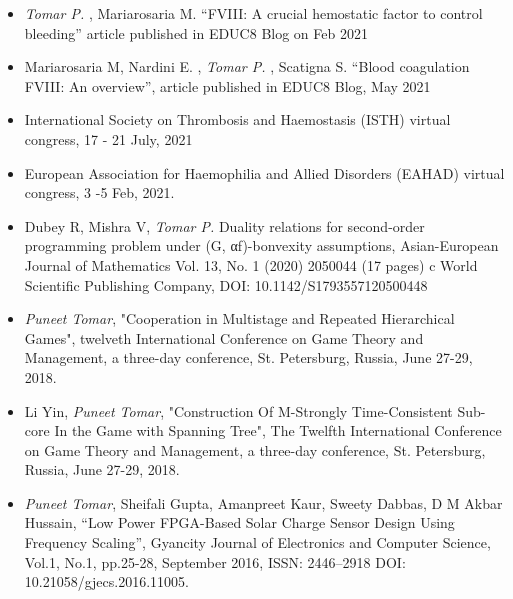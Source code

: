 




\begin{cvparagraph}

\begin{itemize}[label=$\S$]

\item {{\it Tomar P.} , Mariarosaria M.  “FVIII: A crucial hemostatic factor to control bleeding'' article published in EDUC8 Blog on Feb 2021}

\item {Mariarosaria M, Nardini E. , {\it Tomar P.} , Scatigna S. “Blood coagulation FVIII: An overview”, article published in EDUC8 Blog, May 2021}

\item {International Society on Thrombosis and Haemostasis (ISTH) virtual congress, 17 - 21 July, 2021}

\item {European Association for Haemophilia and Allied Disorders (EAHAD) virtual congress, 3 -5 Feb, 2021.}

\item {Dubey R, Mishra V, {\it Tomar P.} Duality relations for second-order programming problem under (G, αf)-bonvexity assumptions, Asian-European Journal of Mathematics Vol. 13, No. 1 (2020) 2050044 (17 pages) c World Scientific Publishing Company, DOI: 10.1142/S1793557120500448}

\item {{\it Puneet Tomar}, "Cooperation in Multistage and Repeated Hierarchical Games", twelveth International Conference on Game Theory and Management, a three-day conference, St. Petersburg, Russia, June 27-29, 2018.}

\item {Li Yin, {\it Puneet Tomar}, "Construction Of M-Strongly Time-Consistent Sub-core In the Game with Spanning Tree", The Twelfth International Conference on Game Theory and Management, a three-day conference, St. Petersburg, Russia, June 27-29, 2018.}

\item {{\it Puneet Tomar}, Sheifali Gupta, Amanpreet Kaur, Sweety Dabbas, D M Akbar Hussain, “Low Power FPGA-Based Solar Charge Sensor Design Using Frequency Scaling”, Gyancity Journal of Electronics and Computer Science, Vol.1, No.1, pp.25-28, September 2016, ISSN: 2446–2918 DOI: 10.21058/gjecs.2016.11005.}


\end{itemize}
\end{cvparagraph}
